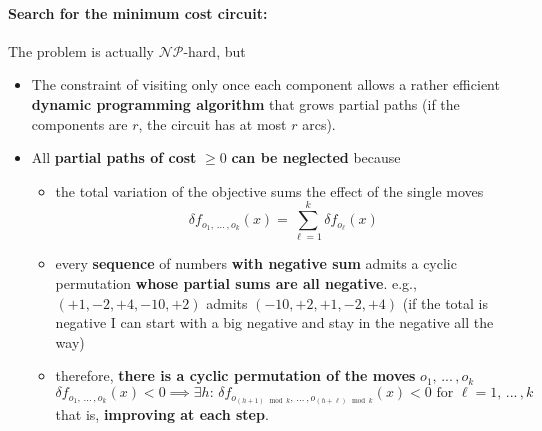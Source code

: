 \paragraph{Search for the minimum cost circuit:} The problem is actually $\mathcal{NP}$-hard, but
\begin{itemize}
	\item The constraint of visiting only once each component allows a rather efficient \textbf{dynamic programming algorithm} that grows partial paths (if the components are $r$, the circuit has at most $r$ arcs).\\
	
	\item All \textbf{partial paths of cost} $\geq 0$ \textbf{can be neglected} because
	\begin{itemize}
		\item the total variation of the objective sums the effect of the single moves
		$$ \delta f_{o_1, \, ... \, , o_k} (x) = \sum_{\ell = 1}^k \delta f_{o_{\ell}} (x) $$
		
		\item every \textbf{sequence} of numbers \textbf{with negative sum} admits a cyclic permutation \textbf{whose partial sums are all negative}. e.g., $(+1, −2, +4, −10, +2)$ admits $(−10, +2, +1, −2, +4)$ (if the total is negative I can start with a big negative and stay in the negative all the way)
		
		\item therefore, \textbf{there is a cyclic permutation of the moves} $o_1, \, ... \, , o_k$
		$$ \delta f_{o_1, \, ... \, , o_k} (x) < 0 \implies \exists h : \, \delta f_{o_{(h+1) \mod k}, \, ... \, , o_{(h+\ell) \mod k}} (x) < 0 \text{ for } \ell = 1, \, ... \, , k $$
		that is, \textbf{improving at each step}.\\
	\end{itemize}
\end{itemize}


